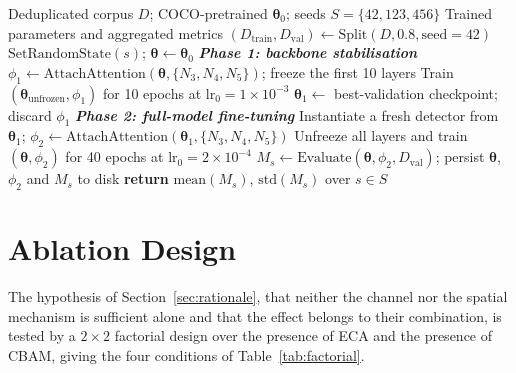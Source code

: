 \documentclass[MScCS]{uccthesis}
\begin{document}
\begin{algorithm}[!ht]
\caption{Two-phase multi-seed training of RGDA-YOLOv8m}
\label{alg:twophase}
\begin{algorithmic}[1]
\Require Deduplicated corpus $D$; COCO-pretrained $\boldsymbol{\theta}_0$;
         seeds $S = \{42, 123, 456\}$
\Ensure  Trained parameters and aggregated metrics
\State $(D_{\mathrm{train}}, D_{\mathrm{val}}) \gets
        \mathrm{Split}(D, 0.8, \mathrm{seed}=42)$
   \State $\mathrm{SetRandomState}(s)$;\quad
          $\boldsymbol{\theta} \gets \boldsymbol{\theta}_0$
   \Statex \quad\textit{\textbf{Phase 1: backbone stabilisation}}
   \State $\phi_1 \gets \mathrm{AttachAttention}(\boldsymbol{\theta},
           \{N_3, N_4, N_5\})$; freeze the first 10 layers
   \State Train $(\boldsymbol{\theta}_{\mathrm{unfrozen}}, \phi_1)$ for 10
          epochs at $\mathrm{lr}_0 = 1{\times}10^{-3}$
   \State $\boldsymbol{\theta}_1 \gets$ best-validation checkpoint;\quad
          discard $\phi_1$
   \Statex \quad\textit{\textbf{Phase 2: full-model fine-tuning}}
   \State Instantiate a fresh detector from $\boldsymbol{\theta}_1$;\quad
          $\phi_2 \gets \mathrm{AttachAttention}(\boldsymbol{\theta}_1,
          \{N_3, N_4, N_5\})$
   \State Unfreeze all layers and train $(\boldsymbol{\theta}, \phi_2)$ for 40
          epochs at $\mathrm{lr}_0 = 2{\times}10^{-4}$
   \State $M_s \gets \mathrm{Evaluate}(\boldsymbol{\theta}, \phi_2,
           D_{\mathrm{val}})$; persist $\boldsymbol{\theta}$, $\phi_2$ and
           $M_s$ to disk
\EndFor
\State \textbf{return} $\mathrm{mean}(M_s)$, $\mathrm{std}(M_s)$ over $s \in S$
\end{algorithmic}
\end{algorithm}

\section{Ablation Design}
\label{sec:ablation_design}

The hypothesis of Section~\ref{sec:rationale}, that neither the channel nor
the spatial mechanism is sufficient alone and that the effect belongs to their
combination, is tested by a $2 \times 2$ factorial design over the presence
of ECA and the presence of CBAM, giving the four conditions of
Table~\ref{tab:factorial}.
\end{document}
